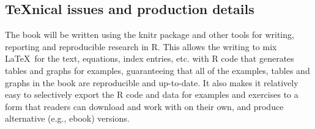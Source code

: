 \documentclass{article}
\newcommand{\R}{\textsf{R}\xspace}
\newcommand{\pkg}[1]{{\normalfont\fontseries{b}\selectfont #1}}
\begin{document}

%
%
\subsection*{\TeX nical issues and production details}
The book will be written using the \pkg{knitr} package and other tools for writing, reporting
and reproducible research in \R.
This allows the writing to mix
\LaTeX\ for the text, equations, index entries, etc. with \R code that generates tables and
graphs for examples, guaranteeing that all of the examples,
tables and graphs in the book are reproducible and up-to-date.
It also makes it relatively easy to selectively export the \R code and data for
examples and exercises to a form that readers can download and work with on their own,
and produce alternative (e.g., ebook) versions.
\end{document}
